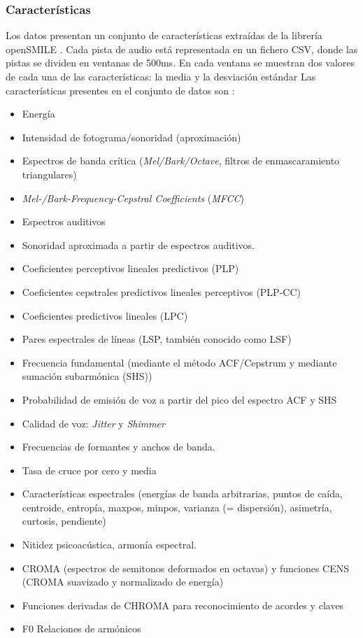 \documentclass[12pt,a4paper,Spanish]{article}
\begin{document}
\subsubsection{Características}
Los datos presentan un conjunto de características extraídas de la librería openSMILE \cite{openSMILE}. Cada pista de audio está representada en un fichero CSV, donde las pistas se dividen en ventanas de 500ms. En cada ventana se muestran dos valores de cada una de las características: la media y la desviación estándar
Las características presentes en el conjunto de datos son \cite{openSMILEfeatures}:
\begin{itemize}
	\item Energía
	\item Intensidad de fotograma/sonoridad (aproximación)
	\item Espectros de banda crítica (\textit{Mel/Bark/Octave}, filtros de enmascaramiento triangulares)
	\item \textit{Mel-/Bark-Frequency-Cepstral Coefficients} (\textit{MFCC})
	\item Espectros auditivos
	\item Sonoridad aproximada a partir de espectros auditivos.
	\item Coeficientes perceptivos lineales predictivos (PLP)
	\item Coeficientes cepstrales predictivos lineales perceptivos (PLP-CC)
	\item Coeficientes predictivos lineales (LPC)
	\item Pares espectrales de líneas (LSP, también conocido como LSF)
	\item Frecuencia fundamental (mediante el método ACF/Cepstrum y mediante sumación subarmónica (SHS))
	\item Probabilidad de emisión de voz a partir del pico del espectro ACF y SHS
	\item Calidad de voz: \textit{Jitter} y \textit{Shimmer}
	\item Frecuencias de formantes y anchos de banda.
	\item Tasa de cruce por cero y media
	\item Características espectrales (energías de banda arbitrarias, puntos de caída, centroide, entropía, maxpos, minpos, varianza (= dispersión), asimetría, curtosis, pendiente)
	\item Nitidez psicoacústica, armonía espectral.
	\item  CROMA (espectros de semitonos deformados en octavas) y funciones CENS (CROMA suavizado y normalizado de energía)
	\item Funciones derivadas de CHROMA para reconocimiento de acordes y claves
	\item F0 Relaciones de armónicos
\end{itemize}
\end{document}
